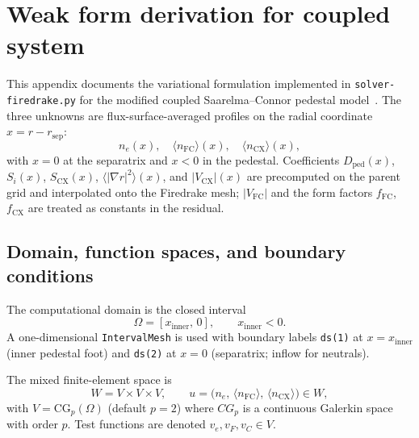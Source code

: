 \documentclass[twocolumn,secnumarabic,amssymb, nobibnotes, aps, prd]{revtex4-2}
\begin{document}
\section{Weak form derivation for coupled system}
\label{app:WeakForms}
This appendix documents the variational formulation implemented in
\texttt{solver-firedrake.py} for the modified coupled Saarelma--Connor pedestal model~\cite{saarelma2023testing}.
The three unknowns are flux-surface-averaged profiles on the radial
coordinate $x = r - r_{\mathrm{sep}}$:
\begin{equation}
  n_e(x),\quad \langle n_{\mathrm{FC}}\rangle(x),\quad \langle n_{\mathrm{CX}}\rangle(x),
\end{equation}
with $x=0$ at the separatrix and $x<0$ in the pedestal.
Coefficients $D_{\mathrm{ped}}(x)$, $S_i(x)$, $S_{\mathrm{CX}}(x)$,
$\langle|\nabla r|^{2}\rangle(x)$, and $|V_{\mathrm{CX}}|(x)$ are precomputed
on the parent grid and interpolated onto the Firedrake mesh;
$|V_{\mathrm{FC}}|$ and the form factors $f_{\mathrm{FC}}$, $f_{\mathrm{CX}}$
are treated as constants in the residual.

\subsection{Domain, function spaces, and boundary conditions}
\label{sec:domain}

The computational domain is the closed interval
\begin{equation}
  \Omega = [x_{\mathrm{inner}},\,0], \qquad x_{\mathrm{inner}} < 0.
\end{equation}
A one-dimensional \texttt{IntervalMesh} is used with boundary labels
\texttt{ds(1)} at $x=x_{\mathrm{inner}}$ (inner pedestal foot) and
\texttt{ds(2)} at $x=0$ (separatrix; inflow for neutrals).

The mixed finite-element space is
\begin{equation}
  W = V \times V \times V, \qquad
  u = \bigl(n_e,\,\langle n_{\mathrm{FC}}\rangle,\,\langle n_{\mathrm{CX}}\rangle\bigr) \in W,
\end{equation}
with $V = \mathrm{CG}_p(\Omega)$ (default $p=2$) where $CG_p$ is a continuous Galerkin space with order $p$.
Test functions are denoted $v_e, v_F, v_C \in V$.
\end{document}
